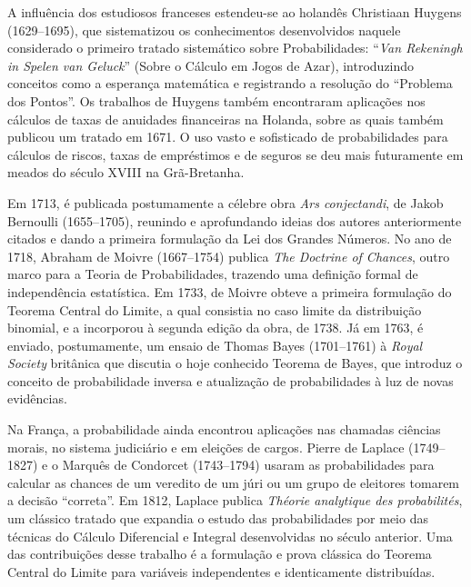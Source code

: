 A influência dos estudiosos franceses estendeu-se ao holandês Christiaan Huygens
(1629--1695), que sistematizou os conhecimentos desenvolvidos naquele considerado o primeiro tratado
sistemático sobre Probabilidades: ``\textit{Van Rekeningh in Spelen van Geluck}''
(Sobre o Cálculo em Jogos de Azar), introduzindo conceitos como a esperança matemática
e registrando a resolução do ``Problema dos Pontos''.
Os trabalhos de Huygens também encontraram aplicações nos cálculos de taxas de anuidades
financeiras na Holanda, sobre as quais também publicou um tratado em 1671.
O uso vasto e sofisticado de probabilidades para cálculos de riscos, taxas de empréstimos
e de seguros se deu mais futuramente em meados do século XVIII na Grã-Bretanha.

Em 1713, é publicada postumamente a célebre obra \textit{Ars conjectandi}, de Jakob
Bernoulli (1655--1705), reunindo e aprofundando ideias dos autores anteriormente citados
e dando a primeira formulação da Lei dos Grandes Números.
No ano de 1718, Abraham de Moivre (1667--1754) publica \textit{The Doctrine of Chances},
outro marco para a Teoria de Probabilidades, trazendo uma definição formal de
independência estatística.
Em 1733, de Moivre obteve a primeira formulação do Teorema Central do Limite, a qual
consistia no caso limite da distribuição binomial, e a incorporou à segunda edição da
obra, de 1738.
Já em 1763, é enviado, postumamente, um ensaio de Thomas Bayes (1701--1761) à \textit{Royal Society}
britânica que discutia o hoje conhecido Teorema de Bayes, que introduz o conceito de
probabilidade inversa e atualização de probabilidades à luz de novas evidências.

Na França, a probabilidade ainda encontrou aplicações nas chamadas ciências morais, no
sistema judiciário e em eleições de cargos.
Pierre de Laplace (1749--1827) e o Marquês de Condorcet (1743--1794) usaram as
probabilidades para calcular as chances de um veredito de um júri ou um grupo de eleitores
tomarem a decisão ``correta''.
Em 1812, Laplace publica \textit{Théorie analytique des probabilités}, um clássico
tratado que expandia o estudo das probabilidades por meio das técnicas do Cálculo
Diferencial e Integral desenvolvidas no século anterior.
Uma das contribuições desse trabalho é a formulação e prova clássica do Teorema Central do
Limite para variáveis independentes e identicamente distribuídas.

